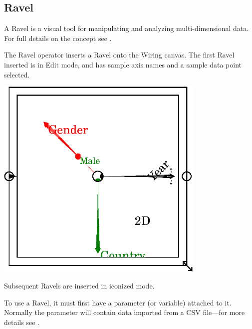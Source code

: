 \subsection{Ravel}

A Ravel is a visual tool for manipulating and analyzing multi-dimensional
data. For full details on the concept see .

The Ravel operator inserts a
Ravel onto the Wiring canvas. The first Ravel inserted is in Edit
mode, and has sample axis names and a sample data point selected.

\includegraphics[width=10cm]{images/RavelBlank}

Subsequent Ravels are inserted in iconized mode.


To use a Ravel, it must first have a parameter (or variable) attached
to it. Normally the parameter will contain data imported from a CSV
file---for more details see .

